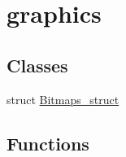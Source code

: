 \hypertarget{group__graphics}{}\section{graphics}
\label{group__graphics}
\subsection*{Classes}
\begin{DoxyCompactItemize}
\item 
struct \hyperlink{structBitmaps__struct}{Bitmaps\+\_\+struct}
\end{DoxyCompactItemize}
\subsection*{Functions}
